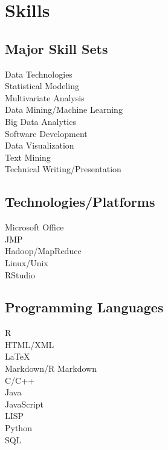 \documentclass[letterpaper]{deedy-resume} %
\begin{document}
\begin{minipage}[t]{0.35\textwidth}
\section{Skills}
\subsection{Major Skill Sets}
Data Technologies\\
Statistical Modeling\\
Multivariate Analysis\\
Data Mining/Machine Learning\\
Big Data Analytics\\
Software Development\\
Data Visualization\\
Text Mining\\
Technical Writing/Presentation

\sectionspace %

\subsection{Technologies/Platforms}
Microsoft Office\\
JMP\\
Hadoop/MapReduce\\
Linux/Unix\\
RStudio\\

\sectionspace %

\subsection{Programming Languages}
R\\
HTML/XML\\
\LaTeX\\
Markdown/R Markdown\\
\sectionspace
{}
C/C++\\
Java\\
JavaScript\\
LISP\\
Python\\
SQL\\



\end{minipage} %
\end{document}
